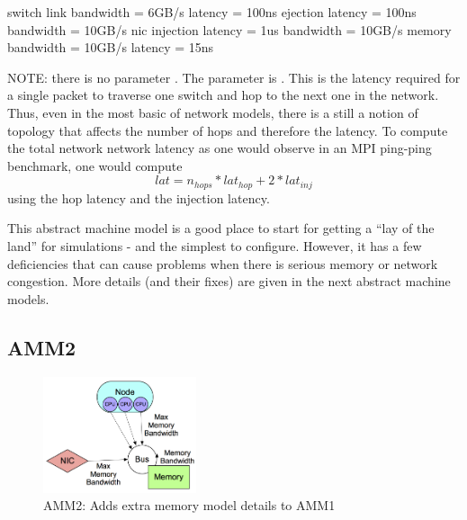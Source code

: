 \begin{ViFile}
switch {
 link {
   bandwidth = 6GB/s
   latency = 100ns
 }
 ejection {
  latency = 100ns
  bandwidth = 10GB/s
 }
}
nic {
 injection {
  latency = 1us
  bandwidth = 10GB/s
 }
}
memory {
 bandwidth = 10GB/s
 latency = 15ns
}
\end{ViFile}

NOTE: there is no parameter .
The parameter is .
This is the latency required for a single packet to traverse one switch and hop to the next one in the network.
Thus, even in the most basic of network models, there is a still a notion of topology that affects the number of hops and therefore the latency.
To compute the total network network latency as one would observe in an MPI ping-ping benchmark, one would compute
\[
lat = n_{hops} * lat_{hop} + 2*lat_{inj}
\]
using the hop latency and the injection latency.

This abstract machine model is a good place to start for getting a ``lay of the land'' for simulations - and the simplest to configure.
However, it has a few deficiencies that can cause problems when there is serious memory or network congestion.
More details (and their fixes) are given in the next abstract machine models. 	

\subsection{AMM2}
\label{subsec:amm2}

\begin{figure}
\begin{center}
\includegraphics[width=0.4\textwidth]{figures/amm/amm2_membus.png}
\end{center}
\caption{AMM2: Adds extra memory model details to AMM1}
\label{fig:amm2}
\end{figure}

